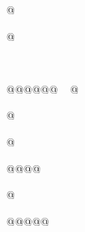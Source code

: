 @













































@











@@@@@@@


@


@










@@@@






















@
























@@@@@








